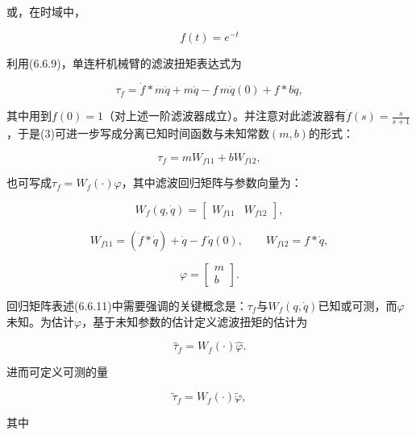 \documentclass[12pt,a4paper]{ctexart}
\begin{document}
或，在时域中，

\begin{equation*}
f(t) = e^{-t}
\end{equation*}

利用(6.6.9)，单连杆机械臂的滤波扭矩表达式为

\begin{equation}\tag{3}
\tau_f = \dot{f} * m\dot{q} + m\dot{q} - f\, m\dot{q}(0) + f * b\dot{q},
\end{equation}

其中用到$f(0)=1$（对上述一阶滤波器成立）。并注意对此滤波器有$\dot{f}(s)=\frac{s}{s+1}$，于是(3)可进一步写成分离已知时间函数与未知常数$(m,b)$的形式：

\begin{equation*}
\tau_f = m W_{f11} + b W_{f12},
\end{equation*}

也可写成$\tau_f = W_f(\cdot)\varphi$，其中滤波回归矩阵与参数向量为：

\begin{equation*}
W_f(q,\dot{q}) = \begin{bmatrix} W_{f11} & W_{f12} \end{bmatrix},
\end{equation*}

\begin{equation*}
W_{f11} = (\dot{f} * \dot{q}) + \dot{q} - f\, \dot{q}(0), \qquad W_{f12} = f * \dot{q},
\end{equation*}

\begin{equation*}
\varphi = \begin{bmatrix} m \\ b \end{bmatrix}.
\end{equation*}

回归矩阵表述(6.6.11)中需要强调的关键概念是：$\tau_f$与$W_f(q,\dot{q})$已知或可测，而$\varphi$未知。为估计$\varphi$，基于未知参数的估计定义滤波扭矩的估计为

\begin{equation}\label{eq:6.6.12}
\hat{\tau}_f = W_f(\cdot)\hat{\varphi}.
\end{equation}

进而可定义可测的量

\begin{equation}\label{eq:6.6.13}
\tilde{\tau}_f = W_f(\cdot)\tilde{\varphi},
\end{equation}

其中
\end{document}
